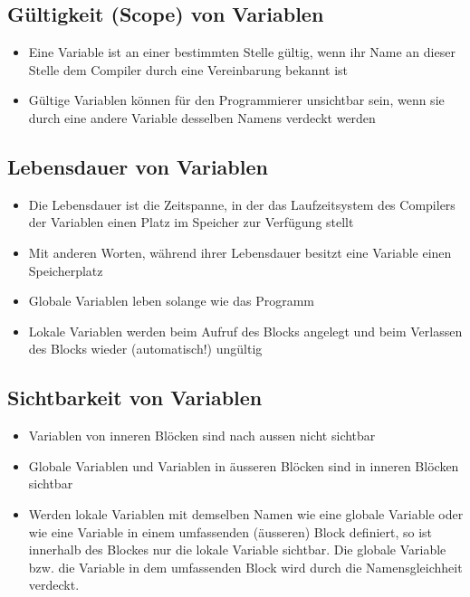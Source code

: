 \subsection{Gültigkeit (Scope) von Variablen}
\label{sec:Gueltigkeit (Scope) von Variablen}
\begin{itemize}
	\item Eine Variable ist an einer bestimmten Stelle gültig, wenn ihr Name an dieser Stelle dem Compiler durch eine Vereinbarung bekannt ist
	\item Gültige Variablen können für den Programmierer unsichtbar sein, wenn sie durch eine andere Variable desselben Namens verdeckt werden
\end{itemize}

\subsection{Lebensdauer von Variablen}
\label{sec:Lebensdauer von Variablen}
\begin{itemize}
	\item Die Lebensdauer ist die Zeitspanne, in der das Laufzeitsystem des Compilers der Variablen einen Platz im Speicher zur Verfügung stellt
	\item Mit anderen Worten, während ihrer Lebensdauer besitzt eine Variable einen Speicherplatz
	\item Globale Variablen leben solange wie das Programm
	\item Lokale Variablen werden beim Aufruf des Blocks angelegt und beim Verlassen des Blocks wieder (automatisch!) ungültig
\end{itemize}

\subsection{Sichtbarkeit von Variablen}
\label{sec:Sichtbarkeit von Variablen}
\begin{itemize}
	\item Variablen von inneren Blöcken sind nach aussen nicht sichtbar
	\item Globale Variablen und Variablen in äusseren Blöcken sind in inneren Blöcken sichtbar
	\item Werden lokale Variablen mit demselben Namen wie eine globale Variable oder wie eine Variable in einem umfassenden (äusseren) Block definiert, so ist innerhalb des Blockes nur die lokale Variable sichtbar. Die globale Variable bzw. die Variable in dem umfassenden Block wird durch die Namensgleichheit verdeckt.
\end{itemize}

